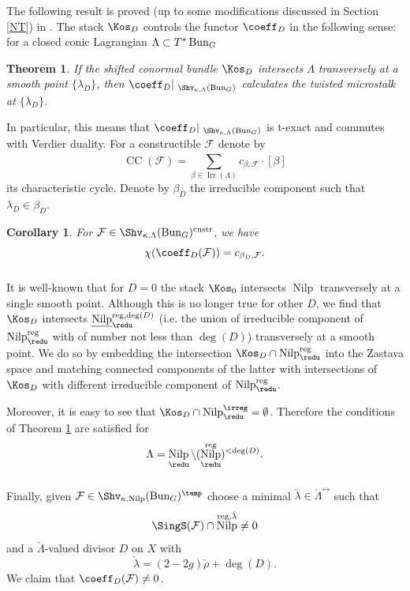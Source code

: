 \documentclass[9pt]{amsart}
\DeclareMathOperator{\reg}{{reg}}
\newcommand{\cF}{{\mathcal F}}
\newtheorem{thm}[subsubsection]{Theorem}
\DeclareMathOperator{\Nilp}{{Nilp}} \DeclareMathOperator{\op}{{op}}
\DeclareMathOperator{\Irr}{{Irr}}
\newtheorem{cor}[subsubsection]{Corollary}
\numberwithin{equation}{section}
\begin{document}
The following result is proved (up to some modifications discussed in Section \ref{NT}) in \cite{NT}. The stack $\Kos_D$ controls the functor $\coeff_D$ in the following sense: for a closed conic Lagrangian $\Lambda \subset T^* \operatorname{{Bun}}_G$
\begin{thm}\label{thm intro}
	If the shifted conormal bundle $\Kos_D$ intersects $\Lambda$ transversely at a smooth point $\{\lambda_D\}$, then $\coeff_D|_{\ \Shv_{\kappa, \Lambda}(\Bun_G)}$ calculates the twisted microstalk at $\{\lambda_D\}$.
\end{thm}
In particular, this means that $\coeff_D|_{\ \Shv_{\kappa, \Lambda}(\Bun_G)}$ is t-exact and commutes with Verdier duality. For a constructible $\cF$ denote by $$\operatorname{CC}(\cF) = \sum_{\beta \in \Irr(\Lambda)}^{} c_{\beta, \cF} \cdot [\beta]$$
its characteristic cycle. Denote by $\beta_D$ the irreducible component such that $\lambda_D \in \beta_D$.
\begin{cor}\label{cor intro}
	For $\cF \in \Shv_{\kappa, \Lambda}(\Bun_G)^{\operatorname{cnstr}}$, 
	we have $$\chi(\coeff_D(\cF)) = c_{\beta_D, \cF}.$$
\end{cor}


\subsubsection{} It is well-known that for $D=0$ the stack $\Kos_0$ intersects $\Nilp$ transversely at a single smooth point. Although this is no longer true for other $D$, we find that $\Kos_D$ intersects $\underline{\Nilp}_{\redu}^{\reg, \deg(D)}$ (i.e. the union of irreducible component of $\Nilp_{\redu}^{\reg}$ with of number not less than $\deg(D)$) transversely at a smooth point. We do so by embedding the intersection $\Kos_D \cap \Nilp_{\redu}^{\reg}$ into the Zastava space and matching connected components of the latter with intersections of $\Kos_D$ with different irreducible component of $\Nilp_{\redu}^{\reg}$.


Moreover, it is easy to see that $\Kos_D \cap\Nilp_{\redu}^{\irreg} = \emptyset$. Therefore the conditions of Theorem \ref{thm intro} are satisfied for $$\Lambda = \Nilp_{\redu} \setminus (\Nilp_{\redu}^{\reg})^{< \deg(D)}.$$

\subsubsection{} Finally, given $\cF \in \Shv_{\kappa, \Nilp}(\Bun_G)^{\temp}$ choose a minimal $\check{\lambda} \in \check{\Lambda}^{\rel}$ such that $$\SingS(\cF) \cap \Nilp^{\reg, \check{\lambda}} \neq 0$$ and a $\check{\Lambda}$-valued divisor $D$ on $X$ with $$\check{\lambda} = (2-2g)\check{\rho} + \deg(D).$$ We claim that $\coeff_D(\cF) \neq 0$.   
\end{document}
